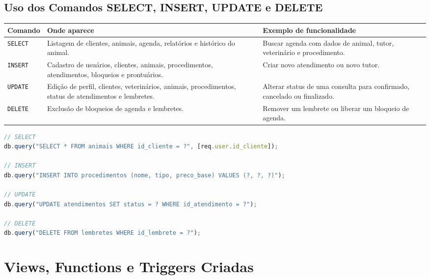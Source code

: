 \documentclass[12pt,a4paper]{article}
\begin{document}
\subsection{Uso dos Comandos SELECT, INSERT, UPDATE e DELETE}

\begin{longtable}{p{3cm}p{5cm}p{6cm}}
\toprule
\textbf{Comando} & \textbf{Onde aparece} & \textbf{Exemplo de funcionalidade} \\
\midrule
\texttt{SELECT} & Listagem de clientes, animais, agenda, relatórios e histórico do animal. & Buscar agenda com dados de animal, tutor, veterinário e procedimento. \\
\texttt{INSERT} & Cadastro de usuários, clientes, animais, procedimentos, atendimentos, bloqueios e prontuários. & Criar novo atendimento ou novo tutor. \\
\texttt{UPDATE} & Edição de perfil, clientes, veterinários, animais, procedimentos, status de atendimentos e lembretes. & Alterar status de uma consulta para confirmado, cancelado ou finalizado. \\
\texttt{DELETE} & Exclusão de bloqueios de agenda e lembretes. & Remover um lembrete ou liberar um bloqueio de agenda. \\
\bottomrule
\end{longtable}

\begin{lstlisting}[style=codigo,language=JavaScript,caption={Exemplos de comandos SQL básicos no backend}]
// SELECT
db.query("SELECT * FROM animais WHERE id_cliente = ?", [req.user.id_cliente]);

// INSERT
db.query("INSERT INTO procedimentos (nome, tipo, preco_base) VALUES (?, ?, ?)");

// UPDATE
db.query("UPDATE atendimentos SET status = ? WHERE id_atendimento = ?");

// DELETE
db.query("DELETE FROM lembretes WHERE id_lembrete = ?");
\end{lstlisting}

\section{Views, Functions e Triggers Criadas}
\end{document}
